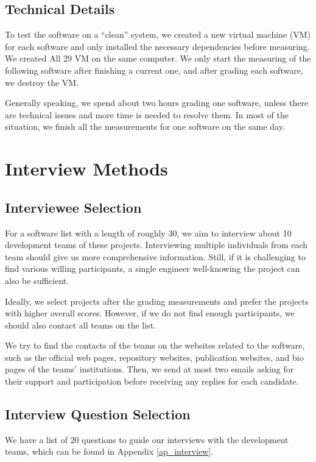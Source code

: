 \subsection{Technical Details}
\label{sec_technical_details}
To test the software on a ``clean'' system, we created a new virtual machine (VM) for each software and only installed the necessary dependencies before measuring. We created All 29 VM on the same computer. We only start the measuring of the following software after finishing a current one, and after grading each software, we destroy the VM.

Generally speaking, we spend about two hours grading one software, unless there are technical issues and more time is needed to resolve them. In most of the situation, we finish all the measurements for one software on the same day.

\section{Interview Methods}
\label{sec_interview_methods}

\subsection{Interviewee Selection}
For a software list with a length of roughly 30, we aim to interview about 10 development teams of these projects. Interviewing multiple individuals from each team should give us more comprehensive information. Still, if it is challenging to find various willing participants, a single engineer well-knowing the project can also be sufficient.

Ideally, we select projects after the grading measurements and prefer the projects with higher overall scores. However, if we do not find enough participants, we should also contact all teams on the list.

We try to find the contacts of the teams on the websites related to the software, such as the official web pages, repository websites, publication websites, and bio pages of the teams' institutions. Then, we send at most two emails asking for their support and participation before receiving any replies for each candidate.

\subsection{Interview Question Selection}

We have a list of 20 questions to guide our interviews with the development teams, which can be found in Appendix \ref{ap_interview}.

